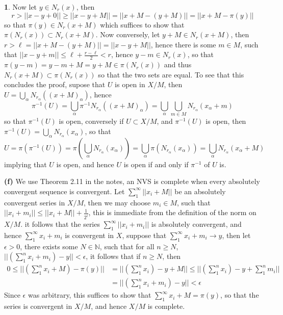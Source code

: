 \documentclass[10.5pt]{article}
\theoremstyle{definition}
\newtheorem{pb}{}
\newcommand{\norm}[1]{\lvert\lvert#1\rvert\rvert}
\begin{document}
\begin{pb}
            Now let \(y \in N_r(x)\), then \[r > \norm{x - y + 0} \geq \norm{x - y + M} = \norm{x + M - (y + M)} = \norm{x + M - \pi(y)}\] so that \(\pi(y) \in N_r(x + M)\) which suffices to show that \(\pi(N_r(x)) \subset N_r(x + M)\). Now conversely, let \(y + M \in N_r(x + M)\), then \(r > \ell = \norm{x + M - (y + M)} = \norm{x - y + M}\), hence there is some \(m \in M\), such that \(\norm{x - y + m} \leq \ell + \frac{r - \ell}{2} < r\), hence \(y - m \in N_r(x)\), so that \(\pi(y - m) = y - m + M = y + M \in \pi(N_r(x))\) and thus \(N_r(x + M) \subset \pi(N_r(x))\) so that the two sets are equal. To see that this concludes the proof, supose that \(U\) is open in \(X/M\), then \(U = \bigcup_{\alpha}N_{r_\alpha}((x + M)_\alpha)\), hence \[\pi^{-1}(U) = \bigcup_\alpha \pi^{-1}N_{r_\alpha}((x + M)_\alpha) = \bigcup_\alpha \bigcup_{m \in M}N_{r_\alpha}(x_\alpha + m)\]
            so that \(\pi^{-1}(U)\) is open, conversely if \(U \subset X/M\), and \(\pi^{-1}(U)\) is open, then \(\pi^{-1}(U) = \bigcup_\alpha N_{r_\alpha}(x_\alpha)\), so that \[U = \pi(\pi^{-1}(U)) = \pi\left(\bigcup_\alpha N_{r_\alpha}(x_\alpha)\right) = \bigcup_\alpha \pi(N_{r_\alpha}(x_\alpha)) = \bigcup_\alpha N_{r_\alpha}(x_\alpha + M)\]
            implying that \(U\) is open, and hence \(U\) is open if and only if \(\pi^{-1}\) of \(U\) is.

            \textbf{(f)} We use Theorem 2.11 in the notes, an NVS is complete when every absolutely convergent sequence is convergent. Let \(\sum_1^\infty \norm{x_i + M}\) be an absolutely convergent series in \(X/M\), then we may choose \(m_i \in M\), such that \(\norm{x_i + m_i} \leq \norm{x_i + M} + \frac{1}{2^i}\), this is immediate from the definition of the norm on \(X/M\). it follows that the series \(\sum_1^\infty \norm{x_i + m_i}\) is absolutely convergent, and hence \(\sum_1^\infty x_i + m_i\) is convergent in \(X\), suppose that \(\sum_1^\infty x_i + m_i \to y\), then let \(\epsilon > 0\), there exists some \(N \in \mathbb{N}\), such that for all \(n \geq N\), \(\norm{\left(\sum_1^n x_i + m_i\right) - y} < \epsilon\), it follows that if \(n \geq N\), then
            \begin{align*}
                0 \leq \norm{\left(\sum_1^n x_i + M\right) - \pi(y)} &= \norm{\left(\sum_1^n x_i\right) - y + M} \leq \norm{\left(\sum_1^n x_i\right) - y + \sum_1^n m_i} \\
                &= \norm{\left(\sum_1^n x_i + m_i\right) - y} < \epsilon
            \end{align*}
            Since \(\epsilon\) was arbitrary, this suffices to show that \(\sum_1^\infty x_i + M = \pi(y)\), so that the series is convergent in \(X/M\), and hence \(X/M\) is complete.
        \end{pb}
\end{document}
